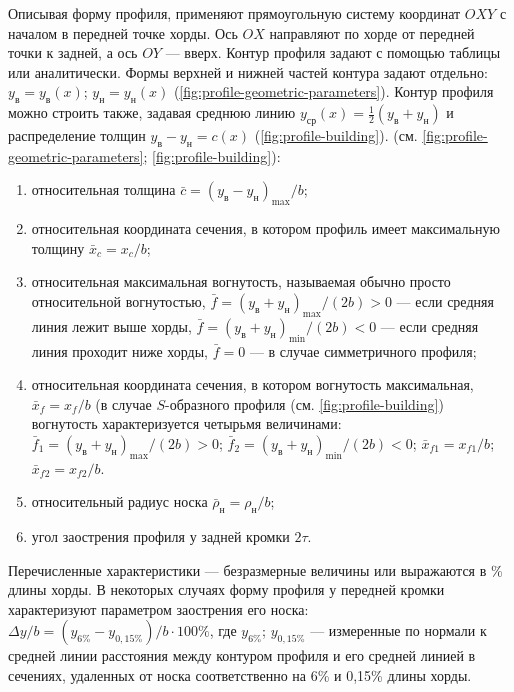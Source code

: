 	Описывая форму профиля, применяют прямоугольную систему координат $OXY$ с началом в передней точке хорды. Ось $OX$ направляют по хорде от передней точки к задней, а ось $OY$ --- вверх. Контур профиля задают с помощью таблицы или аналитически. Формы верхней и нижней частей контура задают отдельно: $y_\mathrm{в} = y_\mathrm{в}\left(x\right)$; $y_\mathrm{н} = y_\mathrm{н}\left(x\right)$ (\cref{fig:profile-geometric-parameters}). Контур профиля можно строить также, задавая среднюю линию $y_\mathrm{ср}\left(x\right) = \frac{1}{2}\left(y_\mathrm{в} + y_\mathrm{н}\right)$ и распределение толщин $y_\mathrm{в} - y_\mathrm{н} = c\left(x\right)$ (\cref{fig:profile-building}).\n
	 (см. \cref{fig:profile-geometric-parameters}; \cref{fig:profile-building}):\n
	\begin{enumerate}
		\item относительная толщина $\bar{c} = \left(y_\mathrm{в} - y_\mathrm{н}\right)_\mathrm{max}/b$;
		\item 	относительная координата сечения, в котором профиль имеет максимальную толщину $\bar{x}_c = x_c/b$;
		\item 	относительная максимальная вогнутость, называемая обычно просто относительной вогнутостью, $\bar{f} = \left(y_\mathrm{в} + y_\mathrm{н}\right)_\mathrm{max}/\left(2b\right) > 0$ --- если средняя линия лежит выше хорды, $\bar{f} = \left(y_\mathrm{в} + y_\mathrm{н}\right)_\mathrm{min}/\left(2b\right) < 0$ --- если средняя линия проходит ниже хорды, $\bar{f} = 0$ --- в случае симметричного профиля;
		\item 	относительная координата сечения, в котором вогнутость максимальная, $\bar{x}_f = x_f/b$ (в случае $S$-образного профиля (см. \cref{fig:profile-building}) вогнутость характеризуется четырьмя величинами: $\bar{f}_1 = \left(y_\mathrm{в} + y_\mathrm{н}\right)_\mathrm{max}/\left(2b\right) > 0$; $\bar{f}_2 = \left(y_\mathrm{в} + y_\mathrm{н}\right)_\mathrm{min}/\left(2b\right) < 0$; $\bar{x}_{f1} = x_{f1}/b$; $\bar{x}_{f2} = x_{f2}/b$.
		\item 	относительный радиус носка $\bar{\rho}_\mathrm{н} = \rho_\mathrm{н}/b$;
		\item 	угол заострения профиля у задней кромки $2\tau$.
	\end{enumerate}
	Перечисленные характеристики --- безразмерные величины или выражаются в \% длины хорды.\n
	В некоторых случаях форму профиля у передней кромки характеризуют параметром заострения его носка: $\Delta y/b = \left(y_{6\%} - y_{0,15\%}\right)/b \cdot 100\%$, где $y_{6\%}$; $y_{0,15\%}$ --- измеренные по нормали к средней линии расстояния между контуром профиля и его средней линией в сечениях, удаленных от носка соответственно на 6\% и 0,15\% длины хорды.\n

